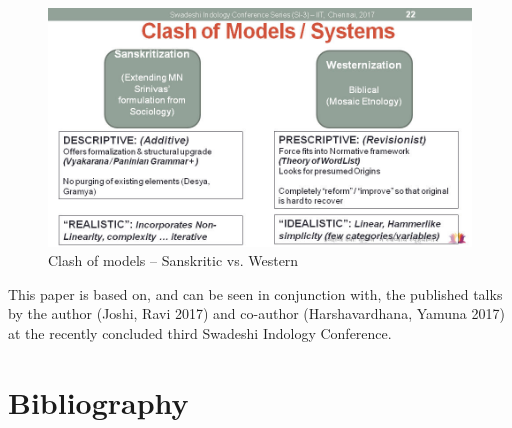 \begin{figure}
\includegraphics[scale=0.3]{"images/article-02/art02-fig03.jpg"}
\caption{Clash of models – Sanskritic vs. Western}\label{art2-fig03}
\end{figure}

This paper is based on, and can be seen in conjunction with, the published talks by the author (Joshi, Ravi 2017) and co-author (Harshavardhana, Yamuna 2017) at the recently concluded third Swadeshi Indology Conference.


\section*{Bibliography}

